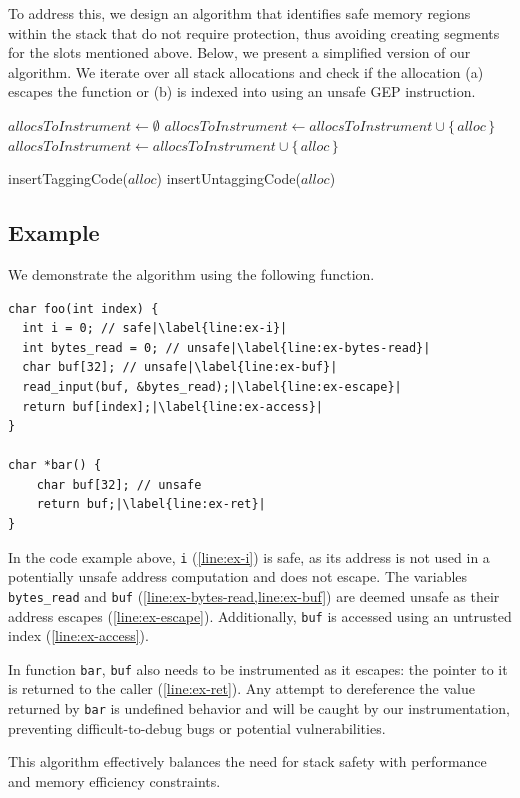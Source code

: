 To address this, we design an algorithm that identifies safe memory regions within the stack that do not require protection, thus avoiding creating segments for the slots mentioned above.
Below, we present a simplified version of our algorithm.
We iterate over all stack allocations and check if the allocation (a) escapes the function or (b) is indexed into using an unsafe \ac{GEP} instruction.

\begin{algorithmic}
    \State $allocsToInstrument \gets \emptyset$
            \State $allocsToInstrument \gets allocsToInstrument \cup \{\,alloc\,\}$
        \State $allocsToInstrument \gets allocsToInstrument \cup \{\,alloc\,\}$
        \EndIf
    \EndFor

        \State insertTaggingCode($alloc$)
        \State insertUntaggingCode($alloc$)
    \EndFor
\end{algorithmic}

\subsection{Example}
\label{subsec:example2}

We demonstrate the algorithm using the following function.

\begin{lstlisting}[frame=h,style=customc,
    label={lst:stack-safety},escapechar=|]
char foo(int index) {
  int i = 0; // safe|\label{line:ex-i}|
  int bytes_read = 0; // unsafe|\label{line:ex-bytes-read}|
  char buf[32]; // unsafe|\label{line:ex-buf}|
  read_input(buf, &bytes_read);|\label{line:ex-escape}|
  return buf[index];|\label{line:ex-access}|
}

char *bar() {
    char buf[32]; // unsafe
    return buf;|\label{line:ex-ret}|
}
\end{lstlisting}

In the code example above, \texttt{i} (\cref{line:ex-i}) is safe, as its address is not used in a potentially unsafe address computation and does not escape.
The variables \texttt{bytes\_read} and \texttt{buf} (\cref{line:ex-bytes-read,line:ex-buf}) are deemed unsafe as their address escapes (\cref{line:ex-escape}).
Additionally, \texttt{buf} is accessed using an untrusted index (\cref{line:ex-access}).

In function \texttt{bar}, \texttt{buf} also needs to be instrumented as it escapes: the pointer to it is returned to the caller (\cref{line:ex-ret}).
Any attempt to dereference the value returned by \texttt{bar} is undefined behavior and will be caught by our instrumentation, preventing difficult-to-debug bugs or potential vulnerabilities.

\noindent
This algorithm effectively balances the need for stack safety with performance and memory efficiency constraints.
